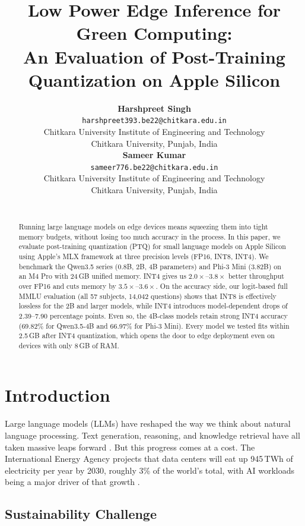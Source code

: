 \documentclass[11pt,a4paper]{article}
\title{\bfseries\Large Low Power Edge Inference for Green Computing: \\
An Evaluation of Post-Training Quantization on Apple Silicon}
\author{
  \small
  \begin{minipage}{0.42\textwidth}
    \centering
    \textbf{\normalsize Harshpreet Singh} \\[3pt]
    \texttt{harshpreet393.be22@chitkara.edu.in} \\
    Chitkara University Institute of Engineering and Technology \\
    Chitkara University, Punjab, India
  \end{minipage}
  \hfill
  \begin{minipage}{0.42\textwidth}
    \centering
    \textbf{\normalsize Sameer Kumar} \\[3pt]
    \texttt{sameer776.be22@chitkara.edu.in} \\
    Chitkara University Institute of Engineering and Technology \\
    Chitkara University, Punjab, India
  \end{minipage}
  \\[6pt]
}
\date{}
\begin{document}
\maketitle

\begin{abstract}
\noindent Running large language models on edge devices means squeezing them into tight memory budgets, without losing too much accuracy in the process. In this paper, we evaluate post-training quantization (PTQ) for small language models on Apple Silicon using Apple's MLX framework at three precision levels (FP16, INT8, INT4). We benchmark the Qwen3.5 series (0.8B, 2B, 4B parameters) and Phi-3 Mini (3.82B) on an M4 Pro with 24\,GB unified memory. INT4 gives us $2.0\times$--$3.8\times$ better throughput over FP16 and cuts memory by $3.5\times$--$3.6\times$. On the accuracy side, our logit-based full MMLU evaluation (all 57 subjects, 14,042 questions) shows that INT8 is effectively lossless for the 2B and larger models, while INT4 introduces model-dependent drops of 2.39--7.90 percentage points. Even so, the 4B-class models retain strong INT4 accuracy (69.82\% for Qwen3.5-4B and 66.97\% for Phi-3 Mini). Every model we tested fits within 2.5\,GB after INT4 quantization, which opens the door to edge deployment even on devices with only 8\,GB of RAM.
\end{abstract}

\section{Introduction}

Large language models (LLMs) have reshaped the way we think about natural language processing. Text generation, reasoning, and knowledge retrieval have all taken massive leaps forward \cite{brown2020language, openai2023gpt4}. But this progress comes at a cost. The International Energy Agency projects that data centers will eat up 945\,TWh of electricity per year by 2030, roughly 3\% of the world's total, with AI workloads being a major driver of that growth \cite{iea2025energyai}.

\subsection{Sustainability Challenge}
\end{document}
